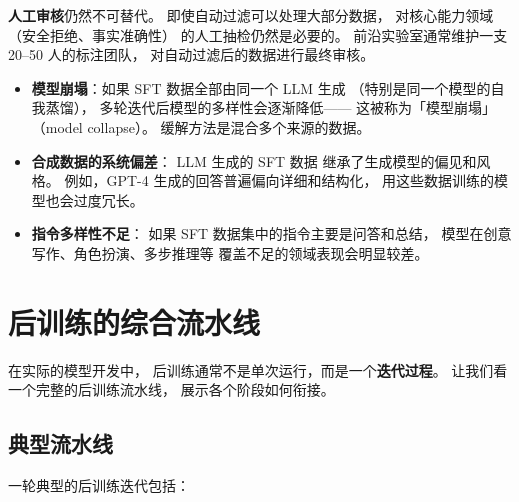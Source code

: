 \textbf{人工审核}仍然不可替代。
即使自动过滤可以处理大部分数据，
对核心能力领域（安全拒绝、事实准确性）
的人工抽检仍然是必要的。
前沿实验室通常维护一支 20--50 人的标注团队，
对自动过滤后的数据进行最终审核。

\begin{warnbox}
\begin{itemize}[noitemsep]
  \item \textbf{模型崩塌}：如果 SFT 数据全部由同一个 LLM 生成
       （特别是同一个模型的自我蒸馏），
        多轮迭代后模型的多样性会逐渐降低——
        这被称为「模型崩塌」（model collapse）。
        缓解方法是混合多个来源的数据。
  \item \textbf{合成数据的系统偏差}：
        LLM 生成的 SFT 数据
        继承了生成模型的偏见和风格。
        例如，GPT-4 生成的回答普遍偏向详细和结构化，
        用这些数据训练的模型也会过度冗长。
  \item \textbf{指令多样性不足}：
        如果 SFT 数据集中的指令主要是问答和总结，
        模型在创意写作、角色扮演、多步推理等
        覆盖不足的领域表现会明显较差。
\end{itemize}
\end{warnbox}

\section{后训练的综合流水线}

在实际的模型开发中，
后训练通常不是单次运行，而是一个\textbf{迭代过程}。
让我们看一个完整的后训练流水线，
展示各个阶段如何衔接。

\subsection{典型流水线}

一轮典型的后训练迭代包括：

